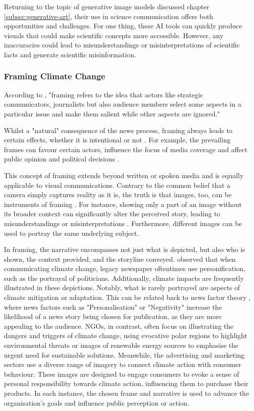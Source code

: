 Returning to the topic of generative image models discussed chapter \ref{subsec:generative-art}, their use in science communication offers both opportunities and challenges. For one thing, these AI tools can quickly produce visuals that could make scientific concepts more accessible. However, any inaccuracies could lead to misunderstandings or misinterpretations of scientific facts and generate scientific misinformation.

\subsubsection{Framing Climate Change}

According to \textcite{Sikorski2020}, "framing refers to the idea that actors like strategic communicators, journalists but also audience members select some aspects in a particular issue and make them salient while other aspects are ignored."

Whilst a "natural" consequence of the news process, framing always leads to certain effects, whether it is intentional or not \parencite[91]{ONeill2022}. For example, the prevailing frames can favour certain actors, influence the focus of media coverage and affect public opinion and political decisions \parencite{Nisbet2006}. 

This concept of framing extends beyond written or spoken media and is equally applicable to visual communications. Contrary to the common belief that a camera simply captures reality as it is, the truth is that images, too, can be instruments of framing \parencite[74]{ONeill2014}. For instance, showing only a part of an image without its broader context can significantly alter the perceived story, leading to misunderstandings or misinterpretations \parencite{Fleming2021}. Furthermore, different images can be used to portray the same underlying subject.

In framing, the narrative encompasses not just what is depicted, but also who is shown, the context provided, and the storyline conveyed.  \textcite{ONeill2014} observed that when communicating climate change, legacy newspaper oftentimes use personification, such as the portrayal of politicians. Additionally, climate impacts are frequently illustrated in these depictions. Notably, what is rarely portrayed are aspects of climate mitigation or adaptation. This can be related back to news factor theory \parencite{Galtung1965}, where news factors such as "Personalisation" or "Negativity" increase the likelihood of a news story being chosen for publication, as they are more appealing to the audience. NGOs, in contrast, often focus on illustrating the dangers and triggers of climate change, using evocative polar regions to highlight environmental threats or images of renewable energy sources to emphasise the urgent need for sustainable solutions. Meanwhile, the advertising and marketing sectors use a diverse range of imagery to connect climate action with consumer behaviour. These images are designed to engage consumers to evoke a sense of personal responsibility towards climate action, influencing them to purchase their products. In each instance, the chosen frame and narrative is used to advance the organisation's goals and influence public perception or action.


